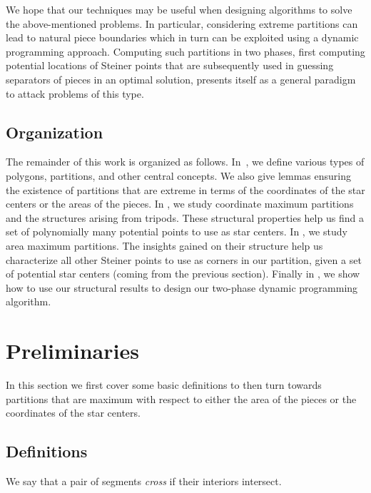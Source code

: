 \documentclass[10pt,a4paper]{article}
\begin{document}
We hope that our techniques may be useful when designing algorithms to solve the above-mentioned problems. In particular, considering extreme partitions can lead to natural piece boundaries which in turn can be exploited using a dynamic programming approach. Computing such partitions in two phases, first computing potential locations of Steiner points that are subsequently used in guessing separators of pieces in an optimal solution, presents itself as a general paradigm to attack problems of this type.

\subsection{Organization}

The remainder of this work is organized as follows.
In~, we define various types of polygons, partitions, and other central concepts.
We also give lemmas ensuring the existence of partitions that are extreme in terms of the coordinates of the star centers or the areas of the pieces.
In , we study coordinate maximum partitions and the structures arising from tripods. These structural properties help us find a set of polynomially many potential points to use as star centers.
In , we study area maximum partitions. The insights gained on their structure help us characterize all other Steiner points to use as corners in our partition, given a set of potential star centers (coming from the previous section).
Finally in , we show how to use our structural results to design our two-phase dynamic programming algorithm.

\section{Preliminaries}\label{sec:prelim}

In this section we first cover some basic definitions to then turn towards partitions that are maximum with respect to either the area of the pieces or the coordinates of the star centers.

\subsection{Definitions}
We say that a pair of segments \emph{cross} if their interiors intersect.
\end{document}
